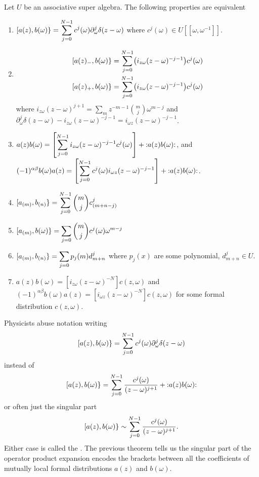 Let $U$ be an associative super algebra.
The following properties are equivalent
\begin{enumerate}
\item
  $\displaystyle[a(z),b(\omega)\}=\sum^{N-1}_{j=0}c^{j}(\omega)\partial_{\omega}^{j}\delta(z-\omega)$
  where $c^{j}(\omega)\in U[[\omega,\omega^{-1}]]$.
\item
\begin{align*}
\superb{a(z)_{-}}{b(\omega)} &= \sum^{N-1}_{j=0}\bigl(i_{z\omega}(z-\omega)^{-j-1}\bigr)c^{j}(\omega)\\
\superb{a(z)_{+}}{b(\omega)} &= \sum^{N-1}_{j=0}\bigl(i_{z\omega}(z-\omega)^{-j-1}\bigr)c^{j}(\omega)
\end{align*}
where $i_{z\omega}(z-\omega)^{j+1}=\sum_{m}z^{-m-1}{m\choose
j}\omega^{m-j}$ and
$\partial_{\omega}^{j}\delta(z-\omega)-i_{z\omega}(z-\omega)^{-j-1}=i_{\omega
z}(z-\omega)^{-j-1}$.
\item $\displaystyle
a(z)b(\omega)=\left[\sum^{N-1}_{j=0}i_{z\omega}(z-\omega)^{-j-1}c^{j}(\omega)\right]+\mathop{:}\nolimits\!a(z)b(\omega)\!\mathop{:}\nolimits$,
and
$\displaystyle
(-1)^{\alpha\beta}b(\omega)a(z)=\left[\sum^{N-1}_{j=0}c^{j}(\omega)i_{\omega z}
(z-\omega)^{-j-1}\right]+\mathop{:}\nolimits\!a(z)b(\omega)\!\mathop{:}\nolimits$.
\item $\displaystyle[a_{(m)},b_{(n)}\}=\sum^{N-1}_{j=0}{m\choose j}c^{j}_{(m+n-j)}$
\item $\displaystyle[a_{(m)},b(\omega)\}=\sum_{j=0}{m\choose
j}c^{j}(\omega)\omega^{m-j}$
\item
$\displaystyle[a_{(m)},b_{(n)}\}=\sum_{j=0}p_{j}(m)d^{j}_{m+n}$
where $p_{j}(x)$ are some polynomial, $d^{j}_{m+n}\in U$.
\item $a(z)b(\omega)=\left[i_{z\omega}(z-\omega)^{-N}\right]c(z,\omega)$
and $(-1)^{\alpha\beta}b(\omega)a(z)=[i_{\omega z}(z-\omega)^{-N}]c(z,\omega)$
for some formal distribution $c(z,\omega)$.
\end{enumerate}

\M
Physicists abuse notation writing
\begin{equation}
[a(z),b(\omega)\}=\sum^{N-1}_{j=0}c^{j}(\omega)\partial_{\omega}^{j}\delta(z-\omega)
\end{equation}
instead of
\begin{equation}
[a(z),b(\omega)\}=\sum^{N-1}_{j=0}\frac{c^{j}(\omega)}{(z-\omega)^{j+1}}+\mathop{:}\nolimits\!a(z)b(\omega)\!\mathop{:}\nolimits
\end{equation}
or often just the singular part
\begin{equation}
[a(z),b(\omega)\}\sim\sum^{N-1}_{j=0}\frac{c^{j}(\omega)}{(z-\omega)^{j+1}}.
\end{equation}
Either case is called the . The
previous theorem tells us the singular part of the operator product
expansion encodes the brackets between all the coefficients of mutually
local formal distributions $a(z)$ and $b(\omega)$.

